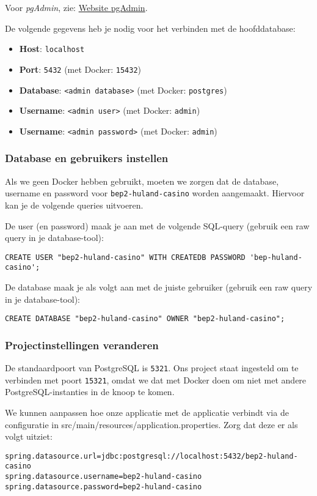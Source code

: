 Voor \textit{pgAdmin}, zie: \href{https://www.pgadmin.org/}{Website pgAdmin}.

De volgende gegevens heb je nodig voor het verbinden met de hoofddatabase:
\begin{itemize}
    \item \textbf{Host}: \texttt{localhost}
    \item \textbf{Port}: \texttt{5432} (met Docker: \texttt{15432})
    \item \textbf{Database}: \texttt{<admin database>} (met Docker: \texttt{postgres})
    \item \textbf{Username}: \texttt{<admin user>} (met Docker: \texttt{admin})
    \item \textbf{Username}: \texttt{<admin password>} (met Docker: \texttt{admin})
\end{itemize}

\subsubsection{Database en gebruikers instellen}
Als we geen Docker hebben gebruikt, moeten we zorgen dat de database, username en password voor \texttt{bep2-huland-casino}
worden aangemaakt. Hiervoor kan je de volgende queries uitvoeren.

De user (en password) maak je aan met de volgende SQL-query (gebruik een raw query in je database-tool):
\begin{verbatim}
CREATE USER "bep2-huland-casino" WITH CREATEDB PASSWORD 'bep-huland-casino';
\end{verbatim}

De database maak je als volgt aan met de juiste gebruiker (gebruik een raw query in je database-tool): 
\begin{verbatim}
CREATE DATABASE "bep2-huland-casino" OWNER "bep2-huland-casino";
\end{verbatim}

\subsubsection{Projectinstellingen veranderen}
De standaardpoort van PostgreSQL is \texttt{5321}. 
Ons project staat ingesteld om te verbinden met poort \texttt{15321}, omdat we 
dat met Docker doen om niet met andere PostgreSQL-instanties in de knoop te komen.

We kunnen aanpassen hoe onze applicatie met de applicatie verbindt via 
de configuratie in src/main/resources/application.properties.
Zorg dat deze er als volgt uitziet:
\begin{verbatim}
spring.datasource.url=jdbc:postgresql://localhost:5432/bep2-huland-casino
spring.datasource.username=bep2-huland-casino
spring.datasource.password=bep2-huland-casino
\end{verbatim}

